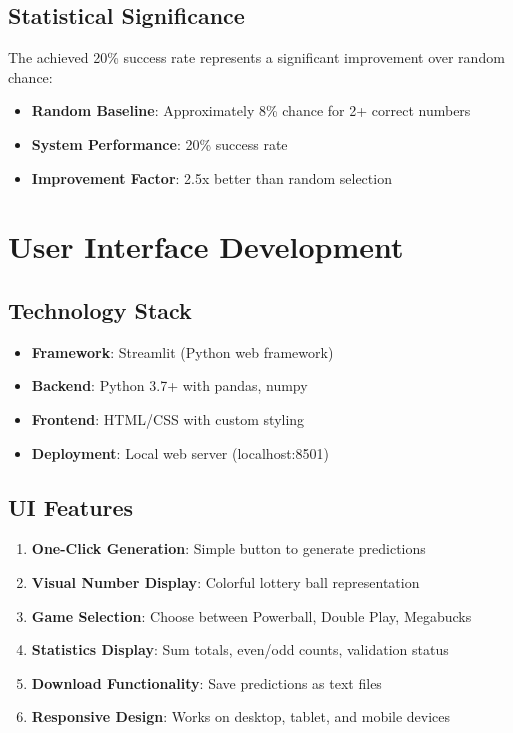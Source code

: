 \documentclass[12pt,a4paper]{article}
\begin{document}
\subsection{Statistical Significance}
The achieved 20\% success rate represents a significant improvement over random chance:
\begin{itemize}
    \item \textbf{Random Baseline}: Approximately 8\% chance for 2+ correct numbers
    \item \textbf{System Performance}: 20\% success rate
    \item \textbf{Improvement Factor}: 2.5x better than random selection
\end{itemize}

\section{User Interface Development}

\subsection{Technology Stack}
\begin{itemize}
    \item \textbf{Framework}: Streamlit (Python web framework)
    \item \textbf{Backend}: Python 3.7+ with pandas, numpy
    \item \textbf{Frontend}: HTML/CSS with custom styling
    \item \textbf{Deployment}: Local web server (localhost:8501)
\end{itemize}

\subsection{UI Features}
\begin{enumerate}
    \item \textbf{One-Click Generation}: Simple button to generate predictions
    \item \textbf{Visual Number Display}: Colorful lottery ball representation
    \item \textbf{Game Selection}: Choose between Powerball, Double Play, Megabucks
    \item \textbf{Statistics Display}: Sum totals, even/odd counts, validation status
    \item \textbf{Download Functionality}: Save predictions as text files
    \item \textbf{Responsive Design}: Works on desktop, tablet, and mobile devices
\end{enumerate}
\end{document}
